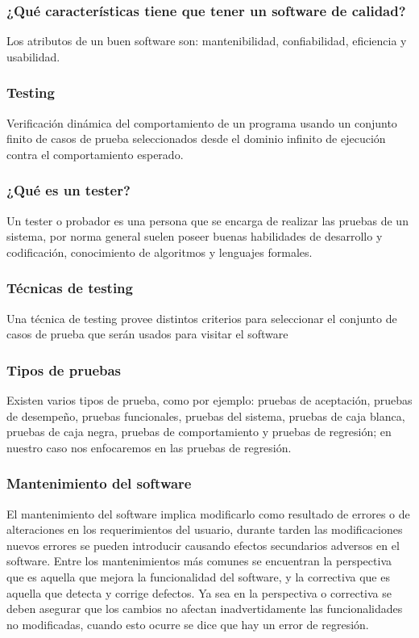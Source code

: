 \documentclass[conference]{IEEEtran}
\begin{document}
\subsubsection{¿Qué características tiene que tener un software de calidad? }

 Los atributos de un buen software son: mantenibilidad, confiabilidad, eficiencia y usabilidad.
\subsubsection{Testing}
Verificación dinámica del comportamiento de un programa usando un conjunto finito de casos de prueba seleccionados desde el dominio infinito de ejecución contra el comportamiento esperado.

\subsubsection{¿Qué es un tester?}

Un tester o probador es una persona que se encarga de realizar las pruebas de un sistema, por norma general suelen poseer buenas habilidades de desarrollo y codificación, conocimiento de algoritmos y lenguajes formales.

\subsubsection{Técnicas de testing}

 Una técnica de testing provee distintos criterios para seleccionar el conjunto de casos de prueba que serán usados para visitar el software
 
\subsubsection{Tipos de pruebas}
 
 Existen varios tipos de prueba, como por ejemplo: pruebas de aceptación, pruebas de desempeño, pruebas funcionales, pruebas del sistema, pruebas de caja blanca, pruebas de caja negra, pruebas de comportamiento y pruebas de regresión; en nuestro caso nos enfocaremos en las pruebas de regresión.
 
\subsubsection{Mantenimiento del software }

El mantenimiento del software implica modificarlo como resultado de errores o de alteraciones en los requerimientos del usuario, durante tarden las modificaciones nuevos errores se pueden introducir causando efectos secundarios adversos en el software. Entre los mantenimientos más comunes se encuentran la perspectiva que es aquella que mejora la funcionalidad del software, y la correctiva que es aquella que detecta y corrige defectos. Ya sea en la perspectiva o correctiva se deben asegurar que los cambios no afectan inadvertidamente las funcionalidades no modificadas, cuando esto ocurre se dice que hay un error de regresión.
\end{document}
